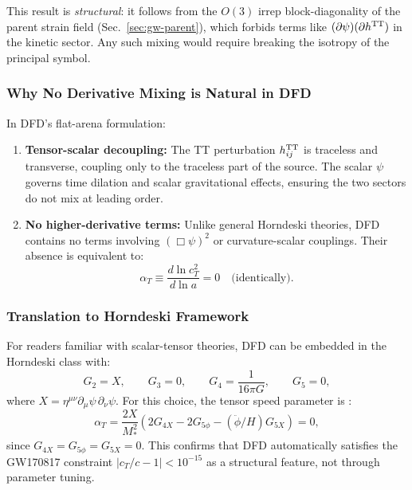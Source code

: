 This result is \textit{structural}: it follows from the $O(3)$ irrep block-diagonality of the parent strain field (Sec.~\ref{sec:gw-parent}), which forbids terms like $(\partial\psi)(\partial h^{\rm TT})$ in the kinetic sector. Any such mixing would require breaking the isotropy of the principal symbol.

\subsubsection{Why No Derivative Mixing is Natural in DFD}

In DFD's flat-arena formulation:
\begin{enumerate}
\item \textbf{Tensor-scalar decoupling:} The TT perturbation $h_{ij}^{\rm TT}$ is traceless and transverse, coupling only to the traceless part of the source. The scalar $\psi$ governs time dilation and scalar gravitational effects, ensuring the two sectors do not mix at leading order.

\item \textbf{No higher-derivative terms:} Unlike general Horndeski theories, DFD contains no terms involving $(\Box\psi)^2$ or curvature-scalar couplings. Their absence is equivalent to:
\begin{equation}
\alpha_T \equiv \frac{d\ln c_T^2}{d\ln a} = 0 \quad \text{(identically)}.
\end{equation}
\end{enumerate}

\subsubsection{Translation to Horndeski Framework}

For readers familiar with scalar-tensor theories, DFD can be embedded in the Horndeski class with:
\begin{equation}
G_2 = X, \qquad G_3 = 0, \qquad G_4 = \frac{1}{16\pi G}, \qquad G_5 = 0,
\end{equation}
where $X = \eta^{\mu\nu}\partial_\mu\psi\,\partial_\nu\psi$. For this choice, the tensor speed parameter is \cite{Bellini2014}:
\begin{equation}
\alpha_T = \frac{2X}{M_*^2}(2G_{4X} - 2G_{5\phi} - (\ddot{\phi}/H)G_{5X}) = 0,
\end{equation}
since $G_{4X} = G_{5\phi} = G_{5X} = 0$. This confirms that DFD automatically satisfies the GW170817 constraint $|c_T/c - 1| < 10^{-15}$ as a structural feature, not through parameter tuning.

